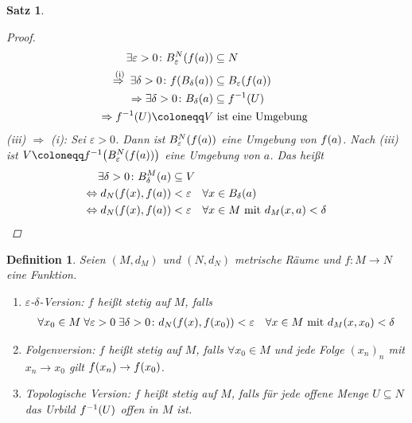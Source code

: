 \documentclass[11pt, twoside, a4paper]{article}
\theoremstyle{plain}
\newtheorem{definition}[blockelement]{Definition}
\newtheorem{satz}[blockelement]{Satz}
\numberwithin{equation}{subsection}
\newcommand{\pair}[1]{\left(#1\right)}
\newcommand{\of}[1]{\mathopen{}\mathclose{}\bgroup\left(#1\aftergroup\egroup\right)}
\newcommand{\equivalent}[0]{\Leftrightarrow{}}
\newcommand{\impl}[0]{\Rightarrow{}}
\newcommand{\fromto}{\rightarrow{}}
\newcommand{\fa}{\;\forall}
\newcommand{\ex}{\;\exists}
\newcommand{\annot}[3][]{\overset{\text{#3}}#1{#2}}
\begin{document}
\begin{satz}
\begin{proof}
            \begin{align*}
                \exists\varepsilon > 0\colon B_{\varepsilon}^{N}\of{f\of{a}} &\subseteq N\\
                \annot{\impl}{(i)} \exists \delta > 0\colon f\of{B_{\delta}\of{a}} &\subseteq B_{\varepsilon}\of{f\of{a}}\\
                \impl \exists \delta > 0\colon B_{\delta}\of{a} &\subseteq f^{-1}\of{U}\\
                \impl f^{-1}\of{U} \coloneqq V &\text{ ist eine Umgebung }
            \end{align*}
            (iii) $\impl$ (i): Sei $\varepsilon > 0$. Dann ist $B_{\varepsilon}^{N}\of{f\of{a}}$ eine Umgebung von $f\of{a}$. Nach (iii) ist $V\coloneqq f^{-1}\of{B_{\varepsilon}^{N}\of{f\of{a}}}$ eine Umgebung von $a$. Das heißt
            \begin{align*}
                \exists\delta > 0\colon B_{\delta}^{M}\of{a} &\subseteq V\\
                \equivalent d_N\of{f\of{x}, f\of{a}} &< \varepsilon\quad\forall x\in B_{\delta}\of{a}\\
                \equivalent d_N\of{f\of{x}, f\of{a}} &< \varepsilon\quad\forall x\in M \text{ mit } d_M\of{x,a} < \delta\qedhere
            \end{align*}
        \end{proof}
    \end{satz}

    \begin{definition} %
        \label{definition:stetigkeit-vollst-metr}
        Seien $\pair{M, d_M}$ und $\pair{N, d_N}$ metrische Räume und $f: M\fromto N$ eine Funktion.
        \begin{enumerate}[label=(\alph*)]
            \item $\varepsilon$-$\delta$-Version: $f$ heißt stetig auf $M$, falls
            \begin{align*}
                \forall x_0\in M\fa \varepsilon > 0\ex \delta > 0\colon d_N\of{f\of{x}, f\of{x_0}} < \varepsilon\quad\forall x\in M \text{ mit } d_M\of{x, x_0} < \delta
            \end{align*}
            \item Folgenversion: $f$ heißt stetig auf $M$, falls $\forall x_0\in M$ und jede Folge $(x_n)_n$ mit $x_n\fromto x_0$ gilt $f\of{x_n}\fromto f\of{x_0}$.
            \item Topologische Version: $f$ heißt stetig auf $M$, falls für jede offene Menge $U\subseteq N$ das Urbild $f^{-1}\of{U}$ offen in $M$ ist.
        \end{enumerate}
    \end{definition}
\end{document}
